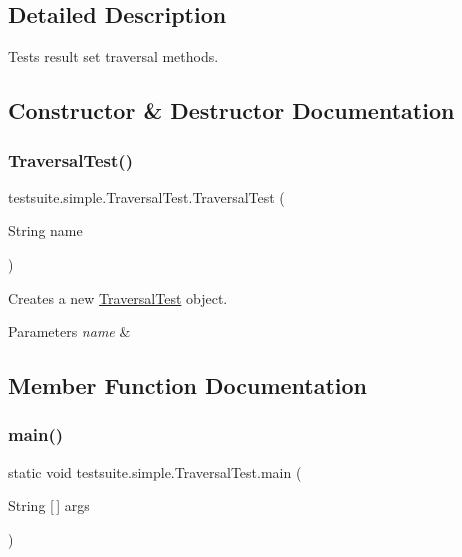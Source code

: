 \subsection{Detailed Description}
Tests result set traversal methods. 

\subsection{Constructor \& Destructor Documentation}
\mbox{\label{classtestsuite_1_1simple_1_1_traversal_test_aab43c85339e7f465ad57bb3db55b6649}} 
\subsubsection{\texorpdfstring{Traversal\+Test()}{TraversalTest()}}
{\footnotesize\ttfamily testsuite.\+simple.\+Traversal\+Test.\+Traversal\+Test (\begin{DoxyParamCaption}\item[{String}]{name }\end{DoxyParamCaption})}

Creates a new \mbox{\hyperlink{classtestsuite_1_1simple_1_1_traversal_test}{Traversal\+Test}} object.


\begin{DoxyParams}{Parameters}
{\em name} & \\
\hline
\end{DoxyParams}


\subsection{Member Function Documentation}
\mbox{\label{classtestsuite_1_1simple_1_1_traversal_test_a26e0a3c13820f4daedefe73785a7fde8}} 
\subsubsection{\texorpdfstring{main()}{main()}}
{\footnotesize\ttfamily static void testsuite.\+simple.\+Traversal\+Test.\+main (\begin{DoxyParamCaption}\item[{String \mbox{[}$\,$\mbox{]}}]{args }\end{DoxyParamCaption})\hspace{0.3cm}{\ttfamily [static]}}

